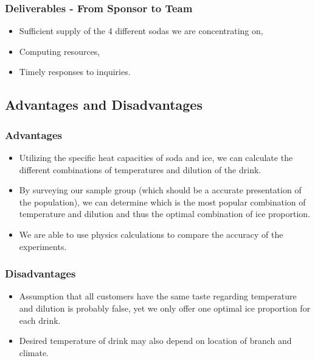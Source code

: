 \documentclass[compress,handout,10pt]{beamer}
\let\olditem\item
\renewcommand{\item}{\setlength{\itemsep}{0.5\baselineskip}\olditem}
\begin{document}
\begin{frame}
    \frametitle{Deliverables - From Sponsor to Team}

\begin{itemize}
    \item Sufficient supply of the 4 different sodas we are concentrating on,
    \item Computing resources,
    \item Timely responses to inquiries.
\end{itemize}
\end{frame}

\subsection{Advantages and Disadvantages}

\begin{frame}
    \frametitle{Advantages}

\begin {itemize}
\item Utilizing the specific heat capacities of soda and ice, we can calculate the different combinations of temperatures and dilution of the drink.
\item By surveying our sample group (which should be a accurate presentation of the population), we can determine which is the most popular combination of temperature and dilution and thus the optimal combination of ice proportion.
\item We are able to use physics calculations to compare the accuracy of the experiments.
\end{itemize}

\end{frame}

\begin{frame}
    \frametitle{Disadvantages}

\begin{itemize}
\item Assumption that all customers have the same taste regarding temperature and dilution is probably false, yet we only offer one optimal ice proportion for each drink.
\item Desired temperature of drink may also depend on location of branch and climate.

\end{itemize}

\end{frame}
 
\end{document}
